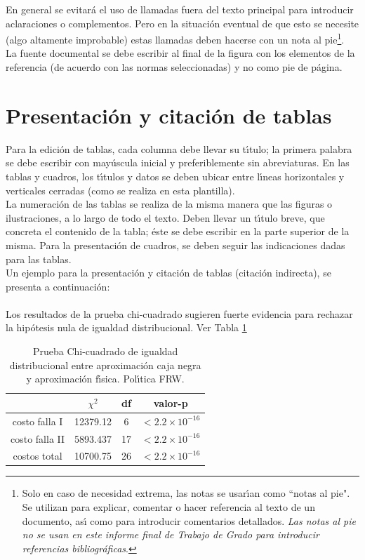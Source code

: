 En general se evitar\'{a} el uso de llamadas fuera del texto principal para introducir aclaraciones o complementos. Pero en la situaci\'{o}n eventual de que esto se necesite (algo altamente improbable) estas llamadas deben hacerse con un nota al pie\footnote{ Solo en caso de necesidad extrema, las notas se usar\'{\i}an como ``notas al pie". Se utilizan para explicar, comentar o hacer referencia al texto de un documento, as\'{\i} como para introducir comentarios detallados. \emph{Las notas al pie no se usan en este informe final de Trabajo de Grado para introducir referencias bibliogr\'{a}ficas}.}.\\

La fuente documental se debe escribir al final de la figura con los elementos de la referencia (de acuerdo con las normas seleccionadas) y no como pie de p\'{a}gina. \\

\section{Presentaci\'{o}n y citaci\'{o}n de tablas}

Para la edici\'{o}n de tablas, cada columna debe llevar su t\'{\i}tulo; la primera palabra se debe escribir con may\'{u}scula inicial y preferiblemente sin abreviaturas. En las tablas y cuadros, los t\'{\i}tulos y datos se deben ubicar entre l\'{\i}neas horizontales y verticales cerradas (como se realiza en esta plantilla).\\

La numeraci\'{o}n de las tablas se realiza de la misma manera que las figuras o ilustraciones, a lo largo de todo el texto. Deben llevar un t\'{\i}tulo breve, que concreta el contenido de la tabla; \'{e}ste se debe escribir en la parte superior de la misma. Para la presentaci\'{o}n de cuadros, se deben seguir las indicaciones dadas para las tablas.\\

Un ejemplo para la presentaci\'{o}n y citaci\'{o}n de tablas (citaci\'{o}n indirecta), se presenta a continuaci\'{o}n:\\
\\
Los resultados de la prueba chi-cuadrado sugieren fuerte evidencia para rechazar la hip\'{o}tesis nula de igualdad distribucional. Ver Tabla \ref{Ta} \\

\begin{table}[htbp]
\centering
\caption{Prueba Chi-cuadrado de igualdad distribucional entre aproximaci\'{o}n caja negra y aproximaci\'{o}n f\'{\i}sica. Pol\'{\i}tica FRW.} \label{Ta}
\begin{tabular}{|c|c|c|c|} \hline              
  & $\chi^{2}$  & df   & valor-p  \\\hline
costo falla I & 12379.12 & 6 & $< 2.2 \times 10^{-16}$ \\\hline
costo falla II & 5893.437 & 17 & $< 2.2 \times 10^{-16}$ \\\hline
costos total & 10700.75 & 26 & $< 2.2 \times 10^{-16}$  \\\hline
\end{tabular}%
\end{table}

